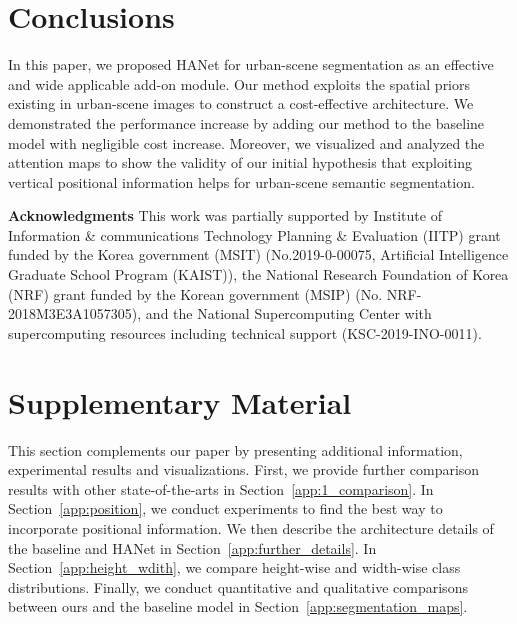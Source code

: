 \documentclass[10pt,twocolumn,letterpaper]{article}
\begin{document}
\section{Conclusions}
\vspace*{-0.1cm}
In this paper, we proposed HANet for urban-scene segmentation as an effective and wide applicable add-on module. 
Our method exploits the spatial priors existing in urban-scene images
to construct a cost-effective architecture. We demonstrated the performance increase by adding our method to the baseline model with negligible cost increase.
Moreover, we visualized and analyzed the attention maps to show the validity of our initial hypothesis that exploiting vertical positional information helps for urban-scene semantic segmentation. 

\vspace*{0.2cm}
{
\noindent\textbf{Acknowledgments} 
This work was partially supported by Institute of Information \& communications Technology Planning \& Evaluation (IITP) grant funded by the Korea government (MSIT) (No.2019-0-00075, Artificial Intelligence Graduate School Program (KAIST)), the National Research Foundation of Korea (NRF) grant funded by the Korean government (MSIP) (No. NRF-2018M3E3A1057305), and the National Supercomputing Center with supercomputing resources including technical support (KSC-2019-INO-0011).  
}








\clearpage

{\small


}

\clearpage


\def\thesection{\Alph{section}}


\setcounter{section}{0}
\section{Supplementary Material} \label{supple}

This section complements our paper by presenting additional information, experimental results and visualizations. First, we provide further comparison results with other state-of-the-arts in Section~\ref{app:1_comparison}. In Section~\ref{app:position}, we conduct experiments to find the best way to incorporate positional information. We then describe the architecture details of the baseline and HANet in Section~\ref{app:further_details}. In Section~\ref{app:height_wdith}, we compare height-wise and width-wise class distributions. Finally, we conduct quantitative and qualitative comparisons between ours and the baseline model in Section~\ref{app:segmentation_maps}.
\end{document}
